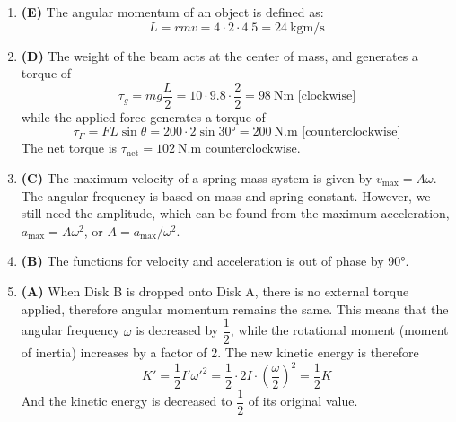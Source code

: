 \documentclass{../../oss-handout}
\begin{document}
\begin{enumerate}[leftmargin=17pt]
\item\textbf{(E)} The angular momentum of an object is defined as:
  \begin{displaymath}
    L=rmv=4\cdot2\cdot 4.5=\boxed{\SI{24}{\kilo\gram\metre\per\second}}
  \end{displaymath}
   
\item\textbf{(D)} The weight of the beam acts at the center of mass, and
  generates a torque of
  \begin{displaymath}
    \tau_g=mg\frac{L}2=10\cdot9.8\cdot\frac22=\SI{98}{\newton\metre}
    \text{ [clockwise]}
  \end{displaymath}
  while the applied force generates a torque of
  \begin{displaymath}
    \tau_F=FL\sin\theta=200\cdot2\sin\ang{30}=\SI{200}{\newton.\metre}
    \text{ [counterclockwise]}
  \end{displaymath}
  The net torque is $\boxed{\tau_\text{net}=\SI{102}{\newton.\metre}}$
  counterclockwise.

\item\textbf{(C)} The maximum velocity of a spring-mass system is given by
  $v_\text{max}=A\omega$. The angular frequency is based on mass and spring
  constant. However, we still need the amplitude, which can be found from the
  maximum acceleration, $a_\text{max}=A\omega^2$, or $A=a_\text{max}/\omega^2$.

\item\textbf{(B)} The functions for velocity and acceleration is out of phase
  by \ang{90}.
  
\item\textbf{(A)} When Disk B is dropped onto Disk A, there is no external
  torque applied, therefore angular momentum remains the same. This means that
  the angular frequency $\omega$ is decreased by $\dfrac12$, while the
  rotational moment (moment of inertia) increases by a factor of 2. The new
  kinetic energy is therefore
  \begin{displaymath}
    K'=\frac12I'\omega'^2=\frac12\cdot2I\cdot\left(\frac{\omega}2\right)^2
    =\frac12K
  \end{displaymath}
  And the kinetic energy is decreased to $\dfrac12$ of its original value.
\end{enumerate}
\end{document}
